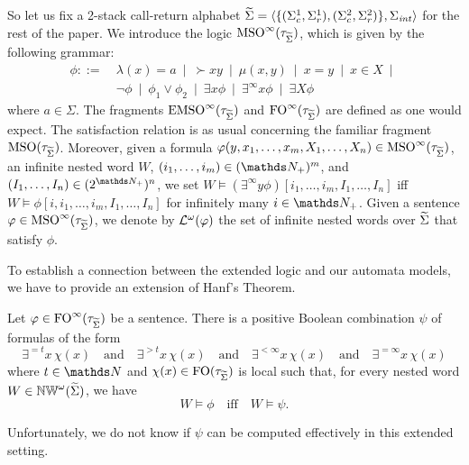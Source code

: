 \documentclass{LMCS}
\begin{document}
So let us fix a 2-stack call-return alphabet
$\widetilde{\Sigma}=\langle\{(\Sigma_c^1,\Sigma_r^1),(\Sigma_c^2,\Sigma_r^2)\},\Sigma_{\mathit{int}}\rangle$
for the rest of the paper. We introduce the logic
$\textup{MSO}^\infty(\tau_{\widetilde{\Sigma}})$, which is given by the following grammar:
\begin{align*}
  \phi ::= &~ \lambda(x)=a ~\mid~ \succ{x}{y} ~\mid~ \mu(x,y) ~\mid~ x = y ~\mid~ x \in X ~\mid~ \\
  &~ \neg \phi ~\mid~ \phi_1 \vee \phi_2 ~\mid~ \exists x \phi ~\mid~
  \exists^\infty x \phi ~\mid~ \exists X \phi
\end{align*}
where $a \in \Sigma$. The fragments $\textup{EMSO}^\infty(\tau_{\widetilde{\Sigma}})$ and
$\textup{FO}^\infty(\tau_{\widetilde{\Sigma}})$ are defined as one would expect.
The satisfaction relation is as usual concerning the familiar fragment
$\textup{MSO}(\tau_{\widetilde{\Sigma}})$. Moreover, given a formula
$\varphi(y,x_1,\ldots,x_m,X_1,\ldots,X_n) \in \textup{MSO}^\infty(\tau_{\widetilde{\Sigma}})$, an infinite
nested word $W$, $(i_1,\ldots,i_m) \in (\infDom)^m$, and $(I_1,\ldots,I_n) \in
(2^{\infDom})^n$, we set $W \models (\exists^\infty y
\phi)[i_1,\ldots,i_m,I_1,\ldots,I_n]$ iff $W \models
\phi[i,i_1,\ldots,i_m,I_1,\ldots,I_n]$ for infinitely many $i \in \infDom$.
Given a sentence $\varphi \in \textup{MSO}^\infty(\tau_{\widetilde{\Sigma}})$, we denote by
$\mathcal{L}^\omega(\varphi)$ the set of infinite nested words over $\widetilde{\Sigma}$ that
satisfy $\phi$.



To establish a connection between the extended logic and our \Buchi automata
models, we have to provide an extension of Hanf's Theorem.



\begin{thm}\label{thm:infhanf} Let $\varphi \in
  \textup{FO}^\infty(\tau_{\widetilde{\Sigma}})$ be a sentence. There is a positive Boolean
  combination $\psi$ of formulas of the form \[\exists^{=t}x\, \chi(x)
  \text{~~~and~~~} \exists^{>t}x\, \chi(x) \text{~~~and~~~}
  \exists^{<\infty}x\, \chi(x) \text{~~~and~~~} \exists^{=\infty}x\, \chi(x)\]
  where $t \in \N$ and $\chi(x) \in \textup{FO}(\tau_{\widetilde{\Sigma}})$ is local such that,
  for every nested word $W \in \mathbb{NW}^\omega(\widetilde{\Sigma})$, we have
  \[W \models \phi \text{~~~iff~~~} W \models \psi.\]
\end{thm}

Unfortunately, we do not know if $\psi$ can be computed effectively in this
extended setting.
\end{document}
